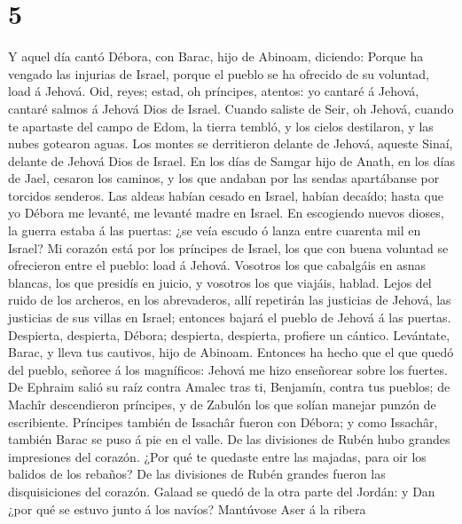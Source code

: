\hypertarget{section-4}{%
\section{5}\label{section-4}}

 Y aquel día cantó Débora, con Barac, hijo de Abinoam,
diciendo:  Porque ha vengado las injurias de Israel, porque
el pueblo se ha ofrecido de su voluntad, load á Jehová. 
Oid, reyes; estad, oh príncipes, atentos: yo cantaré á Jehová, cantaré
salmos á Jehová Dios de Israel.  Cuando saliste de Seir, oh
Jehová, cuando te apartaste del campo de Edom, la tierra tembló, y los
cielos destilaron, y las nubes gotearon aguas.  Los montes
se derritieron delante de Jehová, aqueste Sinaí, delante de Jehová Dios
de Israel.  En los días de Samgar hijo de Anath, en los días
de Jael, cesaron los caminos, y los que andaban por las sendas
apartábanse por torcidos senderos.  Las aldeas habían cesado
en Israel, habían decaído; hasta que yo Débora me levanté, me levanté
madre en Israel.  En escogiendo nuevos dioses, la guerra
estaba á las puertas: ¿se veía escudo ó lanza entre cuarenta mil en
Israel?  Mi corazón está por los príncipes de Israel, los
que con buena voluntad se ofrecieron entre el pueblo: load á Jehová.
 Vosotros los que cabalgáis en asnas blancas, los que
presidís en juicio, y vosotros los que viajáis, hablad. 
Lejos del ruido de los archeros, en los abrevaderos, allí repetirán las
justicias de Jehová, las justicias de sus villas en Israel; entonces
bajará el pueblo de Jehová á las puertas.  Despierta,
despierta, Débora; despierta, despierta, profiere un cántico. Levántate,
Barac, y lleva tus cautivos, hijo de Abinoam.  Entonces ha
hecho que el que quedó del pueblo, señoree á los magníficos: Jehová me
hizo enseñorear sobre los fuertes.  De Ephraim salió su
raíz contra Amalec tras ti, Benjamín, contra tus pueblos; de Machîr
descendieron príncipes, y de Zabulón los que solían manejar punzón de
escribiente.  Príncipes también de Issachâr fueron con
Débora; y como Issachâr, también Barac se puso á pie en el valle. De las
divisiones de Rubén hubo grandes impresiones del corazón. 
¿Por qué te quedaste entre las majadas, para oir los balidos de los
rebaños? De las divisiones de Rubén grandes fueron las disquisiciones
del corazón.  Galaad se quedó de la otra parte del Jordán:
y Dan ¿por qué se estuvo junto á los navíos? Mantúvose Aser á la ribera
